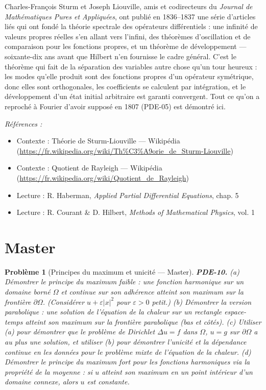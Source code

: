 \documentclass[11pt]{article}
\newtheorem{problem}{Problème}
\newenvironment{refs}{\par\small\noindent\emph{Références :}\begin{itemize}\setlength\itemsep{0pt}}{\end{itemize}\normalsize}
\begin{document}
\noindent Charles-François Sturm et Joseph Liouville, amis et codirecteurs du
\textit{Journal de Mathématiques Pures et Appliquées}, ont publié en 1836--1837 une série d'articles
liés qui ont fondé la théorie spectrale des opérateurs différentiels : une infinité de valeurs
propres réelles s'en allant vers l'infini, des théorèmes d'oscillation et de comparaison pour les
fonctions propres, et un théorème de développement --- soixante-dix ans avant que Hilbert n'en
fournisse le cadre général. C'est le théorème qui fait de la séparation des variables autre chose
qu'un tour heureux : les modes qu'elle produit sont des fonctions propres d'un opérateur
symétrique, donc elles sont orthogonales, les coefficients se calculent par intégration, et le
développement d'un état initial arbitraire est garanti convergent. Tout ce qu'on a reproché à
Fourier d'avoir supposé en 1807 (PDE-05) est démontré ici.

\begin{refs}
\item Contexte : Théorie de Sturm-Liouville --- Wikipédia (\url{https://fr.wikipedia.org/wiki/Th%C3%A9orie_de_Sturm-Liouville})
\item Contexte : Quotient de Rayleigh --- Wikipédia (\url{https://fr.wikipedia.org/wiki/Quotient_de_Rayleigh})
\item Lecture : R. Haberman, \textit{Applied Partial Differential Equations}, chap. 5
\item Lecture : R. Courant \& D. Hilbert, \textit{Methods of Mathematical Physics}, vol. 1
\end{refs}

\bigskip


\section*{Master}

\begin{problem}[{Principes du maximum et unicité --- Master}]
\textbf{PDE-10.} (a) Démontrer le principe du maximum faible : une
fonction harmonique sur un domaine borné $\Omega$ et continue sur son adhérence
atteint son maximum sur la frontière $\partial\Omega$. (Considérer
$u + \varepsilon|x|^2$ pour $\varepsilon > 0$ petit.) (b) Démontrer la version
parabolique : une solution de l'équation de la chaleur sur un rectangle espace-temps atteint son
maximum sur la frontière parabolique (bas et côtés). (c) Utiliser (a) pour démontrer que le
problème de Dirichlet $\Delta u = f$ dans $\Omega$, $u = g$ sur $\partial\Omega$
a au plus une solution, et utiliser (b) pour démontrer l'unicité et la dépendance continue
en les données pour le problème mixte de l'équation de la chaleur. (d) Démontrer le
principe du maximum fort pour les fonctions harmoniques via la propriété de la moyenne : si
$u$ atteint son maximum en un point intérieur d'un domaine connexe, alors $u$ est
constante.
\end{problem}
\end{document}
